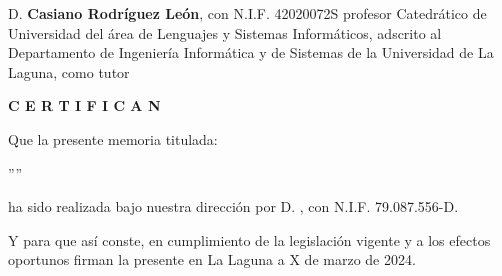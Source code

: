 \newpage
\thispagestyle{empty}

D. {\bf Casiano Rodríguez León}, con N.I.F. 42020072S profesor Catedrático de Universidad 
del área de Lenguajes y Sistemas Informáticos,
adscrito al Departamento de Ingeniería Informática y de Sistemas de la Universidad de La Laguna, como tutor



\pagestyle{empty}

\bigskip
\bigskip
{\bf C E R T I F I C A N}

\bigskip
\bigskip
Que la presente memoria titulada:

\bigskip
''{\it \tfgTitle}''

\bigskip
\bigskip
\bigskip

\noindent ha sido realizada bajo nuestra dirección por D. {\bf \tfgStudentName},
con N.I.F. 79.087.556-D.

\bigskip
\bigskip

Y para que así conste, en cumplimiento de la legislación vigente y a los efectos
oportunos firman la presente en La Laguna a X de marzo de 2024.

